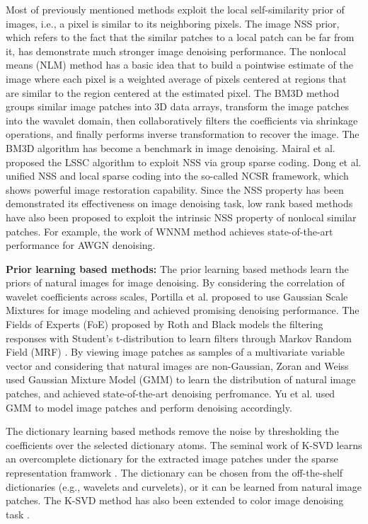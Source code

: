 Most of previously mentioned methods exploit the local self-similarity prior of images, i.e., a pixel is similar to its neighboring pixels. The image NSS prior, which refers to the fact that the similar patches to a local patch can be far from it, has demonstrate much stronger image denoising performance. The nonlocal means (NLM) method \cite{nlm} has a basic idea that to build a pointwise estimate of the image where each pixel is a weighted average of pixels centered at regions that are similar to the region centered at the estimated pixel. The BM3D \cite{bm3d} method groups similar image patches into 3D data arrays, transform the image patches into the wavalet domain, then collaboratively filters the coefficients via shrinkage operations, and finally performs inverse transformation to recover the image. The BM3D algorithm has become a benchmark in image denoising. Mairal et al. \cite{lssc} proposed the LSSC algorithm to exploit NSS via group sparse coding. Dong et al. \cite{ncsr} unified NSS and local sparse coding into the so-called NCSR framework, which shows powerful image restoration capability. Since the NSS property has been demonstrated its effectiveness on image denoising task, low rank based methods \cite{nnm,wnnm} have also been proposed to exploit the intrinsic NSS property of nonlocal similar patches. For example, the work of WNNM \cite{wnnm} method achieves state-of-the-art performance for AWGN denoising. 

\textbf{Prior learning based methods:} The prior learning based methods learn the priors of natural images for image denoising. By considering the correlation of wavelet coefficients across scales, Portilla et al. \cite{blsgsm} proposed to use Gaussian Scale Mixtures for image modeling and achieved promising denoising performance. The Fields of Experts (FoE) \cite{foe} proposed by Roth and Black models the filtering responses with Student's t-distribution to learn filters through Markov Random Field (MRF) \cite{Bishop}. By viewing image patches as samples of a multivariate variable vector and considering that natural images are non-Gaussian, Zoran and Weiss \cite{epll,gmmnips} used Gaussian Mixture Model (GMM) to learn the distribution of natural image patches, and achieved state-of-the-art denoising perfromance. Yu et al. \cite{ple} used GMM to model image patches and perform denoising accordingly. 

The dictionary learning based methods remove the noise by thresholding the coefficients over the selected dictionary atoms. The seminal work of K-SVD \cite{ksvd,ksvdtsp} learns an overcomplete dictionary for the extracted image patches under the sparse representation framwork \cite{olshausen1997sparse,olshausen1996emergence}. The dictionary can be chosen from the off-the-shelf dictionaries (e.g., wavelets and curvelets), or it can be learned from natural image patches. The K-SVD method \cite{ksvd,ksvdtsp} has also been extended to color image denoising task \cite{srcolor,onlinedl}.

